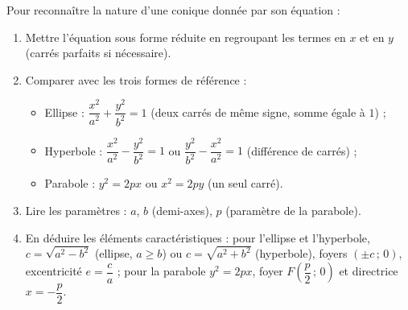 \documentclass[11pt]{article}
\begin{document}
\begin{methode}
Pour reconnaître la nature d'une conique donnée par son équation :
\begin{enumerate}
\item Mettre l'équation sous forme réduite en regroupant les termes en $x$ et en $y$ (carrés parfaits si nécessaire).
\item Comparer avec les trois formes de référence :
\begin{itemize}
\item Ellipse : $\dfrac{x^2}{a^2}+\dfrac{y^2}{b^2}=1$ (deux carrés de même signe, somme égale à $1$) ;
\item Hyperbole : $\dfrac{x^2}{a^2}-\dfrac{y^2}{b^2}=1$ ou $\dfrac{y^2}{b^2}-\dfrac{x^2}{a^2}=1$ (différence de carrés) ;
\item Parabole : $y^2=2px$ ou $x^2=2py$ (un seul carré).
\end{itemize}
\item Lire les paramètres : $a$, $b$ (demi-axes), $p$ (paramètre de la parabole).
\item En déduire les éléments caractéristiques : pour l'ellipse et l'hyperbole, $c=\sqrt{a^2-b^2}$ (ellipse, $a\geq b$) ou $c=\sqrt{a^2+b^2}$ (hyperbole), foyers $(\pm c\,;\,0)$, excentricité $e=\dfrac{c}{a}$ ; pour la parabole $y^2=2px$, foyer $F\left(\dfrac{p}{2}\,;\,0\right)$ et directrice $x=-\dfrac{p}{2}$.
\end{enumerate}
\end{methode}
\end{document}
